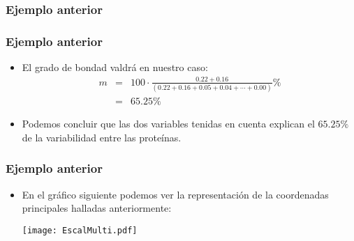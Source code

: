 \begin{frame}
\frametitle{Ejemplo anterior}
\end{frame}

\begin{frame}
\frametitle{Ejemplo anterior}
\begin{itemize}
\item<2->{El grado de bondad valdrá en nuestro caso:
\begin{eqnarray*}
m &= & 100\cdot \frac{0.22+0.16}{(0.22+0.16+0.05+0.04+\cdots +0.00)}\% \\
& = & 65.25\%
\end{eqnarray*}}
\item<3->{Podemos concluir que las dos variables tenidas en cuenta explican el $65.25\%$ de la variabilidad entre las proteínas.}
\end{itemize}
\end{frame}
\begin{frame}
\frametitle{Ejemplo anterior}
\begin{itemize}
\item{En el gráfico siguiente podemos ver la representación de la coordenadas principales halladas anteriormente:
\begin{center}
\texttt{[image: EscalMulti.pdf]}
\end{center}
}
\end{itemize}
\end{frame}
